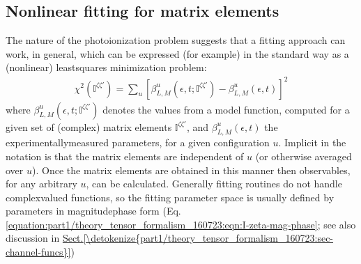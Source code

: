 \documentclass[letterpaper,table,10pt,english]{jupyterBook}
\begin{document}
\subsection{Non\sphinxhyphen{}linear fitting for matrix elements}
\label{\detokenize{part1/numerics_070723:non-linear-fitting-for-matrix-elements}}\label{\detokenize{part1/numerics_070723:sect-numerics-mate-retrieval}}
\sphinxAtStartPar
The nature of the photoionization problem suggests that a fitting approach can work, in general, which can be expressed (for example) in the standard way as a (non\sphinxhyphen{}linear) least\sphinxhyphen{}squares minimization problem:
\begin{equation}\label{equation:part1/numerics_070723:eq:chi2-I}
\begin{split}
\chi^{2}(\mathbb{I}^{\zeta\zeta'})=\sum_{u}\left[\beta^{u}_{L,M}(\epsilon,t;\mathbb{I}^{\zeta\zeta'})-\beta^{u}_{L,M}(\epsilon,t)\right]^{2}
\end{split}
\end{equation}
\sphinxAtStartPar
where \(\beta^{u}_{L,M}(\epsilon,t;\mathbb{I}^{\zeta\zeta'})\) denotes  the values from a model function, computed for a given set of (complex) matrix elements \(\mathbb{I}^{\zeta\zeta'}\), and \(\beta^{u}_{L,M}(\epsilon,t)\) the experimentally\sphinxhyphen{}measured parameters, for a given configuration \(u\). Implicit in the notation is that the matrix elements are independent of \(u\) (or otherwise averaged over \(u\)). Once the matrix elements are obtained in this manner then {\hyperref[\detokenize{backmatter/glossary:term-MF}]{}} observables, for any arbitrary \(u\), can be calculated. Generally fitting routines do not handle complex\sphinxhyphen{}valued functions, so the fitting parameter space is usually defined by parameters in magnitude\sphinxhyphen{}phase form (Eq. \eqref{equation:part1/theory_tensor_formalism_160723:eqn:I-zeta-mag-phase}; see also discussion in \hyperref[\detokenize{part1/theory_tensor_formalism_160723:sec-channel-funcs}]{Sect.\@ \ref{\detokenize{part1/theory_tensor_formalism_160723:sec-channel-funcs}}})
\end{document}
